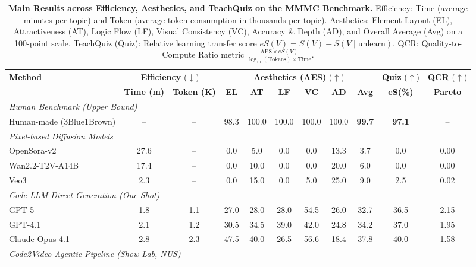 \begin{table}[t]
\centering
\small
\caption{\textbf{Main Results across Efficiency, Aesthetics, and TeachQuiz on the MMMC Benchmark.} 
Efficiency: Time (average minutes per topic) and Token (average token consumption in thousands per topic). 
Aesthetics: Element Layout (EL), Attractiveness (AT), Logic Flow (LF), Visual Consistency (VC), Accuracy \& Depth (AD), and Overall Average (Avg) on a 100-point scale. 
TeachQuiz (Quiz): Relative learning transfer score $eS(V) = S(V) - S(V \mid \text{unlearn})$. 
QCR: Quality-to-Compute Ratio metric $\frac{\text{AES} \times eS(V)}{\log_{10}(\text{Tokens}) \times \text{Time}}$.}
\label{tab:main_results}
\begin{tabular}{lcccccccccc}
\toprule
\textbf{Method} & \multicolumn{2}{c}{\textbf{Efficiency} ($\downarrow$)} & \multicolumn{6}{c}{\textbf{Aesthetics (AES)} ($\uparrow$)} & \textbf{Quiz} ($\uparrow$) & \textbf{QCR} ($\uparrow$) \\
\cmidrule(lr){2-3} \cmidrule(lr){4-9} \cmidrule(lr){10-10} \cmidrule(lr){11-11}
& \textbf{Time (m)} & \textbf{Token (K)} & \textbf{EL} & \textbf{AT} & \textbf{LF} & \textbf{VC} & \textbf{AD} & \textbf{Avg} & \textbf{eS(\%)} & \textbf{Pareto} \\
\midrule
\multicolumn{11}{l}{\textit{Human Benchmark (Upper Bound)}} \\
Human-made (3Blue1Brown) & -- & -- & 98.3 & 100.0 & 100.0 & 100.0 & 100.0 & \textbf{99.7} & \textbf{97.1} & -- \\
\midrule
\multicolumn{11}{l}{\textit{Pixel-based Diffusion Models}} \\
OpenSora-v2 & 27.6 & -- & 0.0 & 5.0 & 0.0 & 0.0 & 13.3 & 3.7 & 0.0 & 0.00 \\
Wan2.2-T2V-A14B & 17.4 & -- & 0.0 & 10.0 & 0.0 & 0.0 & 20.0 & 6.0 & 0.0 & 0.00 \\
Veo3 & 2.3 & -- & 0.0 & 15.0 & 0.0 & 5.0 & 25.0 & 9.0 & 2.5 & 0.02 \\
\midrule
\multicolumn{11}{l}{\textit{Code LLM Direct Generation (One-Shot)}} \\
GPT-5 & 1.8 & 1.1 & 27.0 & 28.0 & 28.0 & 54.5 & 26.0 & 32.7 & 36.5 & 2.15 \\
GPT-4.1 & 2.1 & 1.2 & 30.5 & 34.5 & 39.0 & 42.0 & 24.8 & 34.2 & 37.0 & 1.95 \\
Claude Opus 4.1 & 2.8 & 2.3 & 47.5 & 40.0 & 26.5 & 56.6 & 18.4 & 37.8 & 40.0 & 1.58 \\
\midrule
\multicolumn{11}{l}{\textit{Code2Video Agentic Pipeline (Show Lab, NUS)}} \\

\end{tabular}
\end{table}
